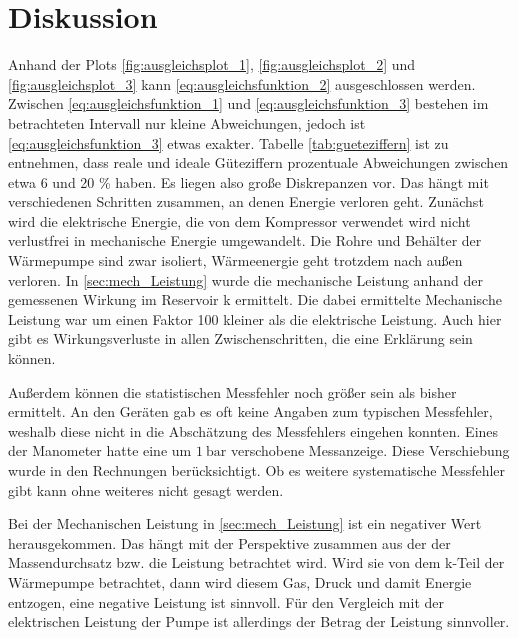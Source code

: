 \section{Diskussion}
Anhand der Plots \ref{fig:ausgleichsplot_1}, \ref{fig:ausgleichsplot_2} und \ref{fig:ausgleichsplot_3}
kann \eqref{eq:ausgleichsfunktion_2} ausgeschlossen werden. 
Zwischen \eqref{eq:ausgleichsfunktion_1} und \eqref{eq:ausgleichsfunktion_3} bestehen im betrachteten Intervall nur kleine Abweichungen,
jedoch ist \eqref{eq:ausgleichsfunktion_3} etwas exakter.
Tabelle \ref{tab:gueteziffern} ist zu entnehmen, dass reale und ideale Güteziffern prozentuale Abweichungen zwischen etwa
6 und 20 \% haben.
Es liegen also große Diskrepanzen vor.
Das hängt mit verschiedenen Schritten zusammen, an denen Energie verloren geht.
Zunächst wird die elektrische Energie, die von dem Kompressor verwendet wird
nicht verlustfrei in mechanische Energie umgewandelt.
Die Rohre und Behälter der Wärmepumpe sind zwar isoliert, 
Wärmeenergie geht trotzdem nach außen verloren.
In \ref{sec:mech_Leistung} wurde die mechanische Leistung anhand der gemessenen Wirkung im Reservoir k   ermittelt.
Die dabei ermittelte Mechanische Leistung war um einen Faktor 100 kleiner als die elektrische Leistung.
Auch hier gibt es Wirkungsverluste in allen Zwischenschritten, die eine Erklärung sein können.

Außerdem können die statistischen Messfehler noch größer sein als bisher ermittelt.
An den Geräten gab es oft keine Angaben zum typischen Messfehler,
weshalb diese nicht in die Abschätzung des Messfehlers eingehen konnten.
Eines der Manometer hatte eine um $\qty{1}{\bar}$ verschobene Messanzeige.
Diese Verschiebung wurde in den Rechnungen berücksichtigt.
Ob es weitere systematische Messfehler gibt kann ohne weiteres nicht gesagt werden.

Bei der Mechanischen Leistung in \ref{sec:mech_Leistung} ist ein negativer Wert herausgekommen. 
Das hängt mit der Perspektive zusammen aus der der Massendurchsatz bzw. die Leistung betrachtet wird.
Wird sie von dem k-Teil der Wärmepumpe betrachtet, dann wird diesem Gas, Druck und damit Energie entzogen,
eine negative Leistung ist sinnvoll.
Für den Vergleich mit der elektrischen Leistung der Pumpe ist allerdings der Betrag der Leistung sinnvoller.